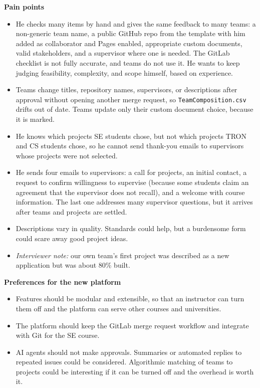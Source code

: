 \documentclass{article}
\begin{document}
    \textbf{Pain points}
    \begin{itemize}
        \item He checks many items by hand and gives the same feedback to many teams: a
        non-generic team name, a public GitHub repo from the template with him added as collaborator
        and Pages enabled, appropriate custom documents, valid stakeholders, and a supervisor where one is needed.
        The GitLab checklist is not fully accurate, and teams do not use it. He wants to keep judging
        feasibility, complexity, and scope himself, based on experience.
        \item Teams change titles, repository names, supervisors, or descriptions after approval without opening
        another merge request, so \texttt{TeamComposition.csv} drifts out of date. Teams update only
        their custom document choice, because it is marked.
        \item He knows which projects SE students chose, but not which projects TRON and CS students
        chose, so he cannot send thank-you emails to supervisors whose projects were not selected.
        \item He sends four emails to supervisors: a call for projects, an initial contact, a request to confirm
        willingness to supervise (because some students claim an agreement that the supervisor does not
        recall), and a welcome with course information. The last one addresses many supervisor questions,
        but it arrives after teams and projects are settled.
        \item Descriptions vary in quality. Standards could help, but a burdensome form could scare away good
        project ideas.
        \item \emph{Interviewer note:} our own team's first project was described as a new application but was
        about 80\% built.
    \end{itemize}

    \textbf{Preferences for the new platform}
    \begin{itemize}
        \item Features should be modular and extensible, so that an instructor can turn them off and the platform
        can serve other courses and universities.
        \item The platform should keep the GitLab merge request workflow and integrate with Git for the SE course.
        \item AI agents should not make approvals. Summaries or automated replies to repeated issues
        could be considered. Algorithmic matching of teams to projects could be interesting if it can be turned
        off and the overhead is worth it.
    \end{itemize}
\end{document}
